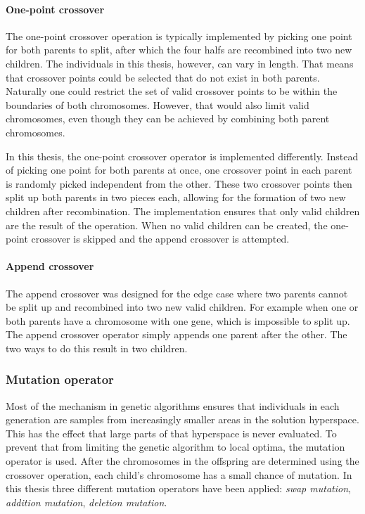 \paragraph{One-point crossover} The one-point crossover operation is typically
implemented by picking one point for both parents to split, after which the
four halfs are recombined into two new children. The individuals in this
thesis, however, can vary in length. That means that crossover points could be
selected that do not exist in both parents. Naturally one could restrict the
set of valid crossover points to be within the boundaries of both chromosomes.
However, that would also limit valid chromosomes, even though they can be
achieved by combining both parent chromosomes.

In this thesis, the one-point crossover operator is implemented differently.
Instead of picking one point for both parents at once, one crossover point in
each parent is randomly picked independent from the other. These two crossover
points then split up both parents in two pieces each, allowing for the
formation of two new children after recombination. The implementation ensures
that only valid children are the result of the operation. When no valid
children can be created, the one-point crossover is skipped and the append
crossover is attempted.

\paragraph{Append crossover} The append crossover was designed for the edge
case where two parents cannot be split up and recombined into two new valid
children. For example when one or both parents have a chromosome with one gene,
which is impossible to split up. The append crossover operator simply appends
one parent after the other. The two ways to do this result in two children.

\subsubsection{Mutation operator}
\label{sec:approach_mutation_operator}
Most of the mechanism in genetic algorithms ensures that individuals in each
generation are samples from increasingly smaller areas in the solution
hyperspace. This has the effect that large parts of that hyperspace is never
evaluated. To prevent that from limiting the genetic algorithm to local optima,
the mutation operator is used. After the chromosomes in the offspring are
determined using the crossover operation, each child's chromosome has a small
chance of mutation. In this thesis three different mutation operators have been
applied: \emph{swap mutation}, \emph{addition mutation}, \emph{deletion mutation}.

